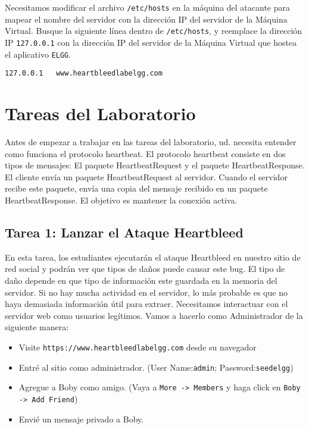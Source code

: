 Necesitamos modificar el archivo \texttt{/etc/hosts} en la máquina del atacante para mapear el nombre del servidor con la dirección IP del servidor de la Máquina Virtual. Busque la siguiente línea dentro de \texttt{/etc/hosts}, y reemplace la dirección IP \texttt{127.0.0.1} con la dirección IP del servidor de la Máquina Virtual que hostea el aplicativo \texttt{ELGG}.


\begin{lstlisting}
127.0.0.1	www.heartbleedlabelgg.com
\end{lstlisting}
 
 


\section{Tareas del Laboratorio}

Antes de empezar a trabajar en las tareas del laboratorio, ud. necesita entender como funciona el protocolo heartbeat.
El protocolo heartbeat consiste en dos tipos de mensajes: El paquete HeartbeatRequest y el paquete HeartbeatResponse. El cliente envía un paquete HeartbeatRequest al servidor. Cuando el servidor recibe este paquete, envía una copia del mensaje recibido en un paquete HeartbeatResponse.
El objetivo es mantener la conexión activa.



\subsection{Tarea 1: Lanzar el Ataque Heartbleed}

En esta tarea, los estudiantes ejecutarán el ataque Heartbleed en nuestro sitio de red social y podrán ver que tipos de daños puede causar este bug.
El tipo de daño depende en que tipo de información este guardada en la memoria del servidor. Si no hay mucha actividad en el servidor, lo más probable es que no haya demasiada información útil para extraer.
Necesitamos interactuar con el servidor web como usuarios legítimos. Vamos a hacerlo como Administrador de la siguiente manera:

	  
  \begin{itemize} 
  \item Visite \texttt{https://www.heartbleedlabelgg.com} desde su navegador
  \item Entré al sitio como administrador. (User Name:\texttt{admin}; Password:\texttt{seedelgg})
  \item Agregue a Boby como amigo. (Vaya a \texttt{More -> Members} y
	  haga click en  \texttt{Boby -> Add Friend})
  \item Envié un mensaje privado a Boby.
  \end{itemize} 
	    
